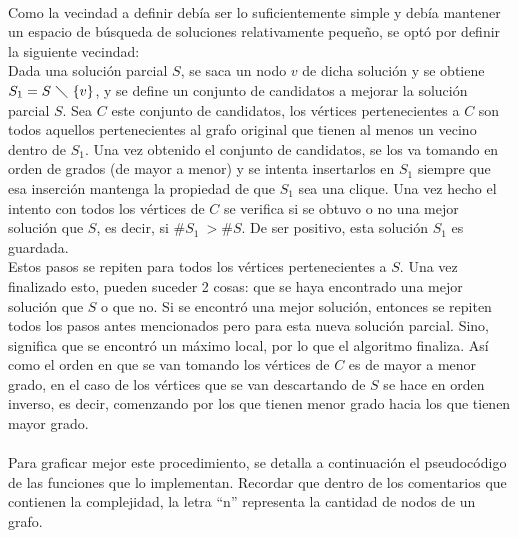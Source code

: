 \paragraph{}
Como la vecindad a definir debía ser lo suficientemente simple y debía mantener un espacio de búsqueda de soluciones relativamente pequeño, se optó por definir la siguiente vecindad:\\
Dada una solución parcial $S$, se saca un nodo $v$ de dicha solución y se obtiene $S_1 = S\ \diagdown\ \{v\}$, y se define un conjunto de candidatos a mejorar la solución parcial $S$. Sea $C$ este conjunto de candidatos, los vértices pertenecientes a $C$ son todos aquellos pertenecientes al grafo original que tienen al menos un vecino dentro de $S_1$. Una vez obtenido el conjunto de candidatos, se los va tomando en orden de grados (de mayor a menor) y se intenta insertarlos en $S_1$ siempre que esa inserción mantenga la propiedad de que $S_1$ sea una clique. Una vez hecho el intento con todos los vértices de $C$ se verifica si se obtuvo o no una mejor solución que $S$, es decir, si $\#S_1\ > \#S$. De ser positivo, esta solución $S_1$ es guardada.\\
Estos pasos se repiten para todos los vértices pertenecientes a $S$. Una vez finalizado esto, pueden suceder 2 cosas: que se haya encontrado una mejor solución que $S$ o que no. Si se encontró una mejor solución, entonces se repiten todos los pasos antes mencionados pero para esta nueva solución parcial. Sino, significa que se encontró un máximo local, por lo que el algoritmo finaliza. Así como el orden en que se van tomando los vértices de $C$ es de mayor a menor grado, en el caso de los vértices que se van descartando de $S$ se hace en orden inverso, es decir, comenzando por los que tienen menor grado hacia los que tienen mayor grado.

\paragraph{}
Para graficar mejor este procedimiento, se detalla a continuación el pseudocódigo de las funciones que lo implementan. Recordar que dentro de los comentarios que contienen la complejidad, la letra ``n'' representa la cantidad de nodos de un grafo.

